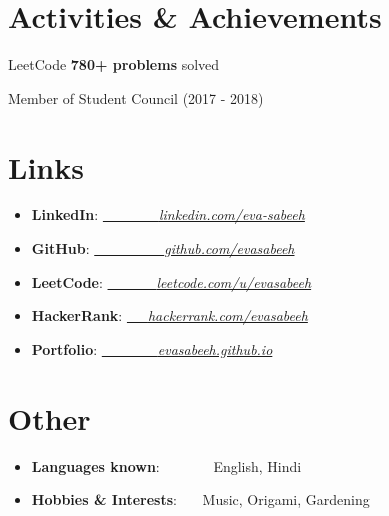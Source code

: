 \documentclass[a4paper,20pt]{article}
\newcommand{\resumeItem}[2]{
  \item\small{
    \textbf{#1}{: #2 \vspace{-2pt}}
  }
}
\newcommand{\resumeSubItem}[2]{\resumeItem{#1}{#2}\vspace{-3pt}}
\newcommand{\resumeSubHeadingListStart}{\begin{itemize}[leftmargin=*]}
\newcommand{\resumeSubHeadingListEnd}{\end{itemize}}
\begin{document}
\section{Activities \& Achievements}
\begin{description}[font=$\bullet$]
  \item {LeetCode \textbf{780+ problems} solved}
  \vspace{-5pt}
  \item {Member of Student Council (2017 - 2018)}
  \vspace{-5pt}
  \end{description}
\vspace{2pt}



\section{Links}
\resumeSubHeadingListStart
\resumeSubItem{LinkedIn}{\href{https://www.linkedin.com/in/eva-sabeeh/}{~~~~~~~~\emph{linkedin.com/eva-sabeeh}}}
\vspace{-1pt}
\resumeSubItem{GitHub}{\href{https://www.github.com/evasabeeh/}{~~~~~~~~~~\emph{github.com/evasabeeh}}}
\vspace{-1pt}
\resumeSubItem{LeetCode}{\href{https://www.leetcode.com/u/evasabeeh/}{~~~~~~~\emph{leetcode.com/u/evasabeeh}}}
\vspace{-1pt}
\resumeSubItem{HackerRank}{\href{https://www.hackerrank.com/profile/evasabeeh}{~~~\emph{hackerrank.com/evasabeeh}}}
\vspace{-1pt}
\resumeSubItem{Portfolio}{\href{https://evasabeeh.github.io/}{~~~~~~~~\emph{evasabeeh.github.io}}}
\vspace{-1pt}
\resumeSubHeadingListEnd
\vspace{2pt}



\section{Other}
\resumeSubHeadingListStart
\resumeSubItem{Languages known}{~~~~~~~English, Hindi}
\vspace{-1pt}
\resumeSubItem{Hobbies \& Interests}{~~~Music, Origami, Gardening}
\resumeSubHeadingListEnd
\vspace{2pt}
\end{document}
